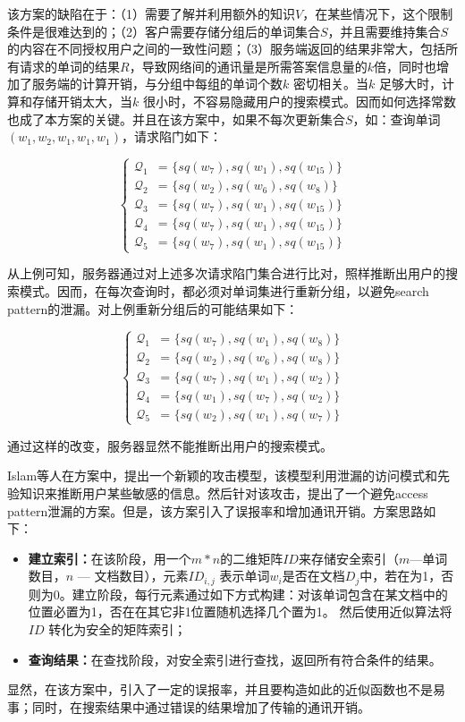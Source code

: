 该方案的缺陷在于：（1）需要了解并利用额外的知识$V$，在某些情况下，这个限制条件是很难达到的；（2）客户需要存储分组后的单词集合$S$，并且需要维持集合$S$的内容在不同授权用户之间的一致性问题；（3）服务端返回的结果非常大，包括所有请求的单词的结果$R$，导致网络间的通讯量是所需答案信息量的$k$倍，同时也增加了服务端的计算开销，与分组中每组的单词个数$k$ 密切相关。当$k$ 足够大时，计算和存储开销太大，当$k$ 很小时，不容易隐藏用户的搜索模式。因而如何选择常数也成了本方案的关键。并且在该方案中，如果不每次更新集合$S$，如：查询单词$(w_1, w_2, w_1, w_1, w_1)$，请求陷门如下：
\begin{flushleft}
\[
  \begin{cases}
   \mathcal{Q}_1 & \text{= } \{ sq(w_7), sq(w_1), sq(w_{15}) \} \\
   \mathcal{Q}_2 & \text{= } \{ sq(w_2), sq(w_6), sq(w_8)    \} \\
   \mathcal{Q}_3 & \text{= } \{ sq(w_7), sq(w_1), sq(w_{15}) \} \\
   \mathcal{Q}_4 & \text{= } \{ sq(w_7), sq(w_1), sq(w_{15}) \} \\
   \mathcal{Q}_5 & \text{= } \{ sq(w_7), sq(w_1), sq(w_{15}) \}
  \end{cases}
\]
\end{flushleft}

从上例可知，服务器通过对上述多次请求陷门集合进行比对，照样推断出用户的搜索模式。因而，在每次查询时，都必须对单词集进行重新分组，以避免search pattern的泄漏。对上例重新分组后的可能结果如下：
\begin{flushleft}
\[
  \begin{cases}
   \mathcal{Q}_1 & \text{= } \{ sq(w_7), sq(w_1), sq(w_8) \} \\
   \mathcal{Q}_2 & \text{= } \{ sq(w_2), sq(w_6), sq(w_8) \} \\
   \mathcal{Q}_3 & \text{= } \{ sq(w_7), sq(w_1), sq(w_2) \} \\
   \mathcal{Q}_4 & \text{= } \{ sq(w_1), sq(w_7), sq(w_2) \} \\
   \mathcal{Q}_5 & \text{= } \{ sq(w_2), sq(w_1), sq(w_7) \}
  \end{cases}
\]
\end{flushleft}
通过这样的改变，服务器显然不能推断出用户的搜索模式。

Islam等人在方案\cite{islam2012access}中，提出一个新颖的攻击模型，该模型利用泄漏的访问模式和先验知识来推断用户某些敏感的信息。然后针对该攻击，提出了一个避免access pattern泄漏的方案。但是，该方案引入了误报率和增加通讯开销。方案思路如下：
\begin{itemize}
  \item \textbf{建立索引：}在该阶段，用一个$m*n$的二维矩阵$ID$来存储安全索引（$m$---单词数目，$n$ --- 文档数目），元素$ID_{i,j}$ 表示单词$w_i$是否在文档$D_j$中，若在为1，否则为0。建立阶段，每行元素通过如下方式构建：对该单词包含在某文档中的位置必置为1，否在在其它非1位置随机选择几个置为1。 然后使用近似算法将$ID$ 转化为安全的矩阵索引；

  \item \textbf{查询结果：}在查找阶段，对安全索引进行查找，返回所有符合条件的结果。
\end{itemize}
显然，在该方案中，引入了一定的误报率，并且要构造如此的近似函数也不是易事；同时，在搜索结果中通过错误的结果增加了传输的通讯开销。


